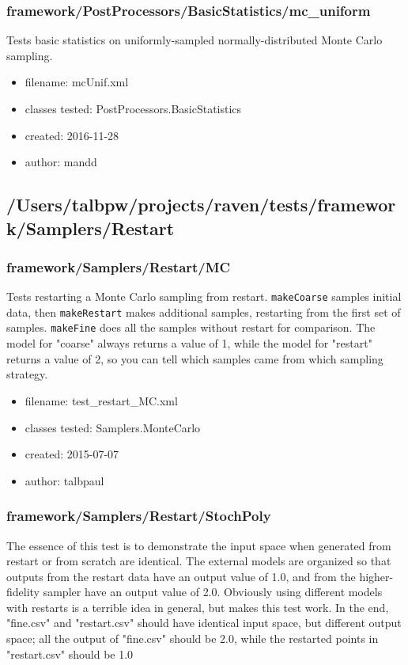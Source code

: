     \subsubsection{framework/PostProcessors/BasicStatistics/mc\_uniform}
      
      Tests basic statistics on uniformly-sampled normally-distributed Monte Carlo sampling.
    
      \begin{itemize}
          \item filename: mcUnif.xml
          \item classes tested: PostProcessors.BasicStatistics
          \item created: 2016-11-28
          \item author: mandd
      \end{itemize}
  \subsection{/Users/talbpw/projects/raven/tests/framework/Samplers/Restart}
    \subsubsection{framework/Samplers/Restart/MC}
      
      Tests restarting a Monte Carlo sampling from restart.  \texttt{makeCoarse} samples initial data, then \texttt{makeRestart}
      makes additional samples, restarting from the first set of samples.  \texttt{makeFine} does all the samples without restart
      for comparison.  The model for "coarse" always returns a value of 1, while the model for "restart" returns a value of 2, so
      you can tell which samples came from which sampling strategy.
    
      \begin{itemize}
          \item filename: test\_restart\_MC.xml
          \item classes tested: Samplers.MonteCarlo
          \item created: 2015-07-07
          \item author: talbpaul
      \end{itemize}
    \subsubsection{framework/Samplers/Restart/StochPoly}
      
      The essence of this test is to demonstrate the input space when generated from restart or from scratch
      are identical.  The external models are organized so that outputs from the restart data have an
      output value of 1.0, and from the higher-fidelity sampler have an output value of 2.0.  Obviously using
      different models with restarts is a terrible idea in general, but makes this test work.
      In the end, "fine.csv" and "restart.csv" should have identical input space, but different output space;
      all the output of "fine.csv" should be 2.0, while the restarted points in "restart.csv" should be 1.0
    
